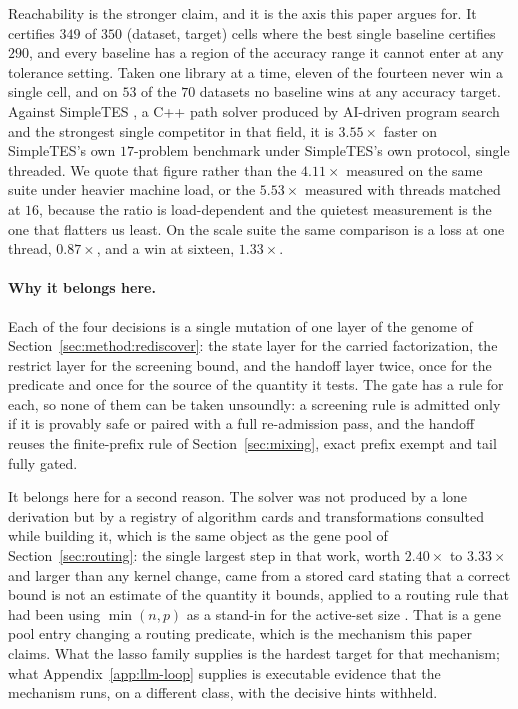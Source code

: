 Reachability is the stronger claim, and it is the axis this paper argues for.
It certifies $349$ of $350$ (dataset, target) cells where the best single
baseline certifies $290$, and every baseline has a region of the accuracy range
it cannot enter at any tolerance setting. Taken one library at a time, eleven
of the fourteen never win a single cell, and on $53$ of the $70$ datasets no
baseline wins at any accuracy target. Against SimpleTES
\citep{Ye2026StructuredScaling}, a C++ path solver produced by AI-driven
program search and the strongest single competitor in that field, it is
$3.55\times$ faster on SimpleTES's own $17$-problem benchmark under SimpleTES's
own protocol, single threaded. We quote that figure rather than the
$4.11\times$ measured on the same suite under heavier machine load, or the
$5.53\times$ measured with threads matched at $16$, because the ratio is
load-dependent and the quietest measurement is the one that flatters us least.
On the scale suite the same comparison is a loss at one thread, $0.87\times$,
and a win at sixteen, $1.33\times$.

\paragraph{Why it belongs here.} Each of the four decisions is a single
mutation of one layer of the genome of Section~\ref{sec:method:rediscover}:
the state layer for the carried factorization, the restrict layer for the
screening bound, and the handoff layer twice, once for the predicate and once
for the source of the quantity it tests. The gate has a rule for each, so none
of them can be taken unsoundly: a screening rule is admitted only if it is
provably safe or paired with a full re-admission pass, and the handoff reuses
the finite-prefix rule of Section~\ref{sec:mixing}, exact prefix exempt and
tail fully gated.

It belongs here for a second reason. The solver was not produced by a lone
derivation but by a registry of algorithm cards and transformations consulted
while building it, which is the same object as the gene pool of
Section~\ref{sec:routing}: the single largest step in that work, worth
$2.40\times$ to $3.33\times$ and larger than any kernel change, came from a
stored card stating that a correct bound is not an estimate of the quantity it
bounds, applied to a routing rule that had been using $\min(n,p)$ as a stand-in
for the active-set size \citep{OptiVault2026Lasso}. That is a gene pool entry
changing a routing predicate, which is the mechanism this paper claims. What
the lasso family supplies is the hardest target for that mechanism; what
Appendix~\ref{app:llm-loop} supplies is executable evidence that the mechanism
runs, on a different class, with the decisive hints withheld.

